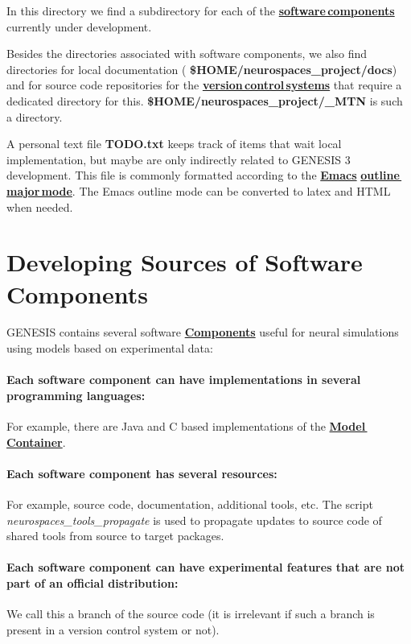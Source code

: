 \documentclass[12pt]{article}
\begin{document}
In this directory we find a subdirectory for each of the
\href{../genesis-components/genesis-components.tex}{\bf software\,components} currently under development.

Besides the directories associated with software components, we also
find directories for local documentation ({\bf
  \$HOME/neurospaces\_project/docs}) and for source code repositories
for the \href{../version-control/version-control.tex}{\bf version\,control\,systems} 
that require a dedicated directory for this.  {\bf
  \$HOME/neurospaces\_project/\_MTN} is such a directory.

A personal text file {\bf TODO.txt} keeps track of items that wait
local implementation, but maybe are only indirectly related to GENESIS
3 development.  This file is commonly formatted according to the
\href{http://www.gnu.org/software/emacs/}{\bf Emacs}
\href{http://www.emacswiki.org/emacs/OutlineMode}{\bf outline\,major\,mode}.
The Emacs outline mode can be converted to latex and HTML when needed.


\section*{Developing Sources of Software Components}


GENESIS contains several software \href{../reserved-words/reserved-words.tex}{\bf Components} useful for neural simulations using models based on experimental data:
\paragraph{\bf Each software component can have implementations in several programming languages:} For example, there are Java and C based implementations of the \href{../model-container/model-container.tex}{\bf Model\,Container}.
\paragraph{\bf Each software component has several resources:} For example, source code, documentation, additional tools, etc.  The script {\it neurospaces\_tools\_propagate} is used to propagate updates to source code of shared tools from source to target packages.

\paragraph{\bf Each software component can have experimental features that are not part of an official distribution:} We call this a branch of the source code (it is irrelevant if such a branch is present in a version control system or not). 
\end{document}
